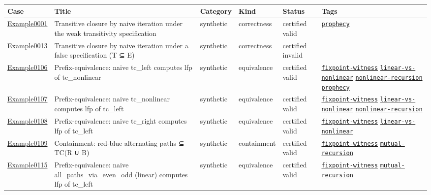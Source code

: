 \documentclass[10pt]{article}
\begin{document}
\begin{longtable}{@{}lp{}p{}p{}p{}p{}@{}}
\toprule
Case & Title & Category & Kind & Status & Tags \\
\midrule
\endhead
\hyperref[case:Example0001]{Example0001} & Transitive closure by naive iteration under the weak transitivity specification & synthetic & correctness & certified valid & {\scriptsize \hyperref[tag:prophecy]{\texttt{prophecy}}} \\
\hyperref[case:Example0013]{Example0013} & Transitive closure by naive iteration under a false specification (T ⊆ E) & synthetic & correctness & certified invalid & {\scriptsize } \\
\hyperref[case:Example0106]{Example0106} & Prefix-equivalence: naive tc\_left computes lfp of tc\_nonlinear & synthetic & equivalence & certified valid & {\scriptsize \hyperref[tag:fixpoint-witness]{\texttt{fixpoint-witness}} \hyperref[tag:linear-vs-nonlinear]{\texttt{linear-vs-nonlinear}} \hyperref[tag:nonlinear-recursion]{\texttt{nonlinear-recursion}} \hyperref[tag:prophecy]{\texttt{prophecy}}} \\
\hyperref[case:Example0107]{Example0107} & Prefix-equivalence: naive tc\_nonlinear computes lfp of tc\_left & synthetic & equivalence & certified valid & {\scriptsize \hyperref[tag:fixpoint-witness]{\texttt{fixpoint-witness}} \hyperref[tag:linear-vs-nonlinear]{\texttt{linear-vs-nonlinear}} \hyperref[tag:nonlinear-recursion]{\texttt{nonlinear-recursion}}} \\
\hyperref[case:Example0108]{Example0108} & Prefix-equivalence: naive tc\_right computes lfp of tc\_left & synthetic & equivalence & certified valid & {\scriptsize \hyperref[tag:fixpoint-witness]{\texttt{fixpoint-witness}} \hyperref[tag:linear-vs-nonlinear]{\texttt{linear-vs-nonlinear}}} \\
\hyperref[case:Example0109]{Example0109} & Containment: red-blue alternating paths ⊆ TC(R ∪ B) & synthetic & containment & certified valid & {\scriptsize \hyperref[tag:fixpoint-witness]{\texttt{fixpoint-witness}} \hyperref[tag:mutual-recursion]{\texttt{mutual-recursion}}} \\
\hyperref[case:Example0115]{Example0115} & Prefix-equivalence: naive all\_paths\_via\_even\_odd (linear) computes lfp of tc\_left & synthetic & equivalence & certified valid & {\scriptsize \hyperref[tag:fixpoint-witness]{\texttt{fixpoint-witness}} \hyperref[tag:mutual-recursion]{\texttt{mutual-recursion}}} \\

\end{longtable}
\end{document}
